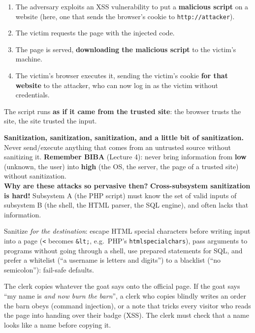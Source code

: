 \begin{defnbox}[title={How XSS attacks a victim}]
\begin{enumerate}
  \item The adversary exploits an XSS vulnerability to put a \textbf{malicious script} on a
        website (here, one that sends the browser's cookie to \texttt{http://attacker}).
  \item The victim requests the page with the injected code.
  \item The page is served, \textbf{downloading the malicious script} to the victim's machine.
  \item The victim's browser executes it, sending the victim's cookie \textbf{for that website} to
        the attacker, who can now log in as the victim without credentials.
\end{enumerate}
The script runs \textbf{as if it came from the trusted site}: the browser trusts the site, the site
trusted the input.
\end{defnbox}

\begin{propbox}[title={How to avoid injection?}]
\textbf{Sanitization, sanitization, sanitization, and a little bit of sanitization.} Never
send/execute anything that comes from an untrusted source without sanitizing it. \textbf{Remember
BIBA} (Lecture 4): never bring information from \textbf{low} (unknown, the user) into \textbf{high}
(the OS, the server, the page of a trusted site) without sanitization. \\
\textbf{Why are these attacks so pervasive then?} \textbf{Cross-subsystem sanitization is hard!}
Subsystem A (the PHP script) must know the set of valid inputs of subsystem B (the shell, the HTML
parser, the SQL engine), and often lacks that information.
\end{propbox}

\begin{rembox}[title={In practice (not in the slides)}]
Sanitize \emph{for the destination}: escape HTML special characters before writing input into a
page (\texttt{<} becomes \texttt{\&lt;}, e.g.\ PHP's \texttt{htmlspecialchars}), pass arguments to
programs without going through a shell, use prepared statements for SQL, and prefer a whitelist
(``a username is letters and digits'') to a blacklist (``no semicolon''): fail-safe defaults.
\end{rembox}

\begin{goatbox}
The clerk copies whatever the goat says onto the official page. If the goat says ``my name is
\emph{and now burn the barn}'', a clerk who copies blindly writes an order the barn obeys (command
injection), or a note that tricks every visitor who reads the page into handing over their badge
(XSS). The clerk must check that a name looks like a name before copying it.
\end{goatbox}

